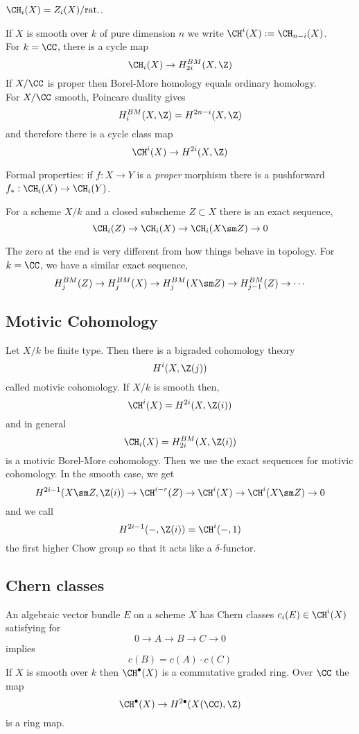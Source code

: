 \documentclass{article}
\begin{document}
\begin{defn}
$\CH_i(X) = Z_i(X) / \text{rat.}$.
\end{defn}

If $X$ is smooth over $k$ of pure dimension $n$ we write $\CH^i(X) := \CH_{n-i}(X)$.
\bigskip\\
For $k = \CC$, there is a cycle map 
\[ \CH_i(X) \to H_{2i}^{BM}(X, \Z) \]
If $X / \CC$ is proper then Borel-More homology equals ordinary homology. 
\bigskip\\
For $X/\CC$ smooth, Poincare duality gives
\[ H_{i}^{BM}(X, \Z) = H^{2n-i}(X, \Z) \]
and therefore there is a cycle class map
\[ \CH^i(X) \to H^{2i}(X, \Z) \]

Formal properties: if $f : X \to Y$ is a \textit{proper} morphism there is a pushforward $f_* : \CH_i(X) \to \CH_i(Y)$. 

\begin{theorem}
For a scheme $X / k$ and a closed subscheme $Z \subset X$ there is an exact sequence,
\[ \CH_i(Z) \to \CH_i(X) \to \CH_i(X \sm Z) \to 0 \]
\end{theorem}

\begin{rmk}
The zero at the end is very different from how things behave in topology. For $k = \CC$, we have a similar exact sequence,
\[ H^{BM}_j(Z) \to H^{BM}_j(X) \to H^{BM}_j(X \sm Z) \to H^{BM}_{j-1}(Z) \to \cdots \]
\end{rmk}

\subsection{Motivic Cohomology}

Let $X / k$ be finite type. Then there is a bigraded cohomology theory
\[ H^i(X, \Z(j)) \]
called motivic cohomology. If $X / k$ is smooth then,
\[ \CH^i(X) = H^{2i}(X, \Z(i)) \]
and in general
\[ \CH_i(X) = H^{BM}_{2i}(X, \Z(i)) \]
is a motivic Borel-More cohomology. Then we use the exact sequences for motivic cohomology. In the smooth case, we get
\[ H^{2i - 1}(X \sm Z, \Z(i)) \to \CH^{i-r}(Z) \to \CH^i(X) \to \CH^i(X \sm Z) \to 0 \]
and we call
\[ H^{2i-1}(-,\Z(i)) = \CH^i(-,1) \]
the first higher Chow group so that it acts like a $\delta$-functor. 

\subsection{Chern classes}

An algebraic vector bundle $E$ on a scheme $X$ has Chern classes $c_i(E) \in \CH^i(X)$ satisfying for
\[ 0 \to A \to B \to C \to 0 \]
implies
\[ c(B) = c(A) \cdot c(C) \]
If $X$ is smooth over $k$ then $\CH^\bullet(X)$ is a commutative graded ring. Over $\CC$ the map
\[ \CH^\bullet(X) \to H^{2\bullet}(X(\CC), \Z) \]
is a ring map.
\end{document}
